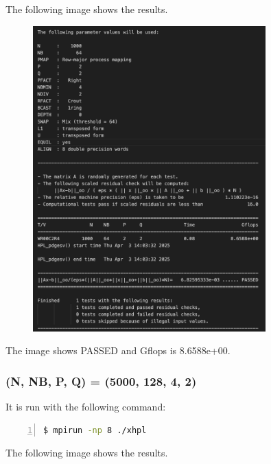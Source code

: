 \documentclass{article}
\begin{document}
The following image shows the results.

\begin{figure}[htbp]
    \centering
    \includegraphics[width=0.8\textwidth]{./img/HPL_1000_64_2_2.png}
\end{figure}

The image shows PASSED and Gflops is 8.6588e+00.

\clearpage

\subsubsection*{(N, NB, P, Q) = (5000, 128, 4, 2)}

It is run with the following command:

\begin{lstlisting}[language=bash, basicstyle=\ttfamily\small, numbers=left, numberstyle=\tiny\color{gray}, stepnumber=1, frame=single]
$ mpirun -np 8 ./xhpl
\end{lstlisting}

The following image shows the results.
\end{document}
